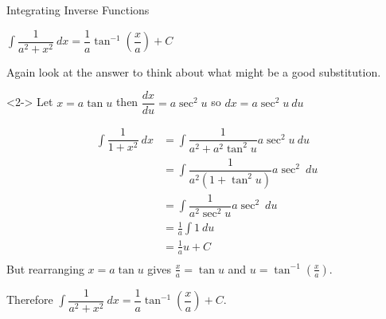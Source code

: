 \documentclass[8pt]{beamer}
\begin{document}
	\begin{frame}[shrink]{Integrating Inverse Functions}
		\begin{definition}
			$ \int \dfrac{1}{a^{2}+x^{2}}\ dx=\dfrac{1}{a}\tan ^{-1}\left( \dfrac{x}{a}\right) +C$
		\end{definition}
		\alert{Again look at the answer to think about what might be a good substitution.}
		
		\begin{solution}<2->
			Let $x=a\tan u$ then $\dfrac{dx}{du} = a \sec^{2} u$ so $dx = a \sec^{2} u \ du$
			
			\begin{align*}
			\int \dfrac{1}{1+x^{2}}\ dx &= \int \dfrac{1}{a^{2}+a^{2}\tan^{2}u}a \sec^{2}u \ du \\
			&= \int \dfrac{1}{a^{2}(1+\tan ^{2}u)}a \sec^{2} \ du \\
			&= \int \dfrac{1}{a^{2} \sec^{2} u}a \sec^{2}\ du\\
			&= \frac{1}{a}\int 1 \ du \\
			&= \frac{1}{a}u+C \\
			\end{align*}
			But rearranging $x=a\tan u$ gives $\frac{x}{a} = \tan u$ and $u = \tan ^{-1}(\frac{x}{a})$.
			
			Therefore $\int \dfrac{1}{a^{2}+x^{2}}\ dx=\dfrac{1}{a}\tan ^{-1}\left( \dfrac{x}{a}\right) +C$.
			
		\end{solution}
	\end{frame}
	
\end{document}
